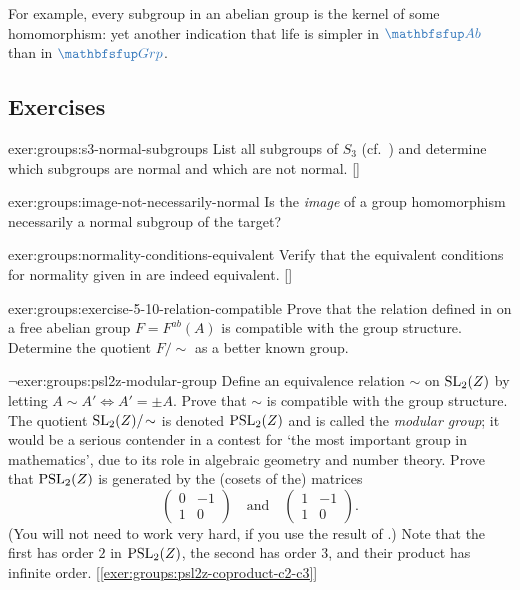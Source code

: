 For example, every subgroup in an abelian group is the kernel of some
homomorphism: yet another indication that life is simpler in
$\categ{Ab}$ than in $\categ{Grp}$.

\subsection*{Exercises}

\begin{exer}{\exerused}{exer:groups:s3-normal-subgroups}
  List all subgroups of $S_3$ (cf.\
  ) and determine which
  subgroups are normal and which are not
  normal. []
\end{exer}
\begin{exer}{}{exer:groups:image-not-necessarily-normal}
  Is the \emph{image} of a group homomorphism necessarily a normal
  subgroup of the target?
\end{exer}
\begin{exer}{\exerused}{exer:groups:normality-conditions-equivalent}
  Verify that the equivalent conditions for normality given in
   are indeed
  equivalent. []
\end{exer}
\begin{exer}{}{exer:groups:exercise-5-10-relation-compatible}
  Prove that the relation defined in
   on a free abelian group
  $F = F^{ab}(A)$ is compatible with the group structure. Determine
  the quotient $F/\!\sim$ as a better known group.
\end{exer}
\begin{exer}{$\lnot$}{exer:groups:psl2z-modular-group}
  Define an equivalence relation $\sim$ on $\mathrm{SL}_2(Z)$ by
  letting $A \sim A' \iff A' = \pm A$. Prove that $\sim$ is compatible
  with the group structure. The quotient $\mathrm{SL}_2(Z)/\!\sim$ is
  denoted $\mathrm{PSL}_2(Z)$ and is called the \emph{modular group};
  it would be a serious contender in a contest for `the most important
  group in mathematics', due to its role in algebraic geometry and
  number theory. Prove that $\mathrm{PSL}_2(Z)$ is generated by the
  (cosets of the) matrices
  \[
    \begin{pmatrix} 0 & -1 \\ 1 & 0 \end{pmatrix} \quad \text{and}
    \quad
    \begin{pmatrix} 1 & -1 \\ 1 & 0 \end{pmatrix}.
  \]
  (You will not need to work very hard, if you use the result of
  \Cref{exer:groups:sl2z-generated-by-s-t}.) Note that the first has
  order $2$ in $\mathrm{PSL}_2(Z)$, the second has order $3$, and
  their product has infinite
  order. [\ref{exer:groups:psl2z-coproduct-c2-c3}]
\end{exer}
